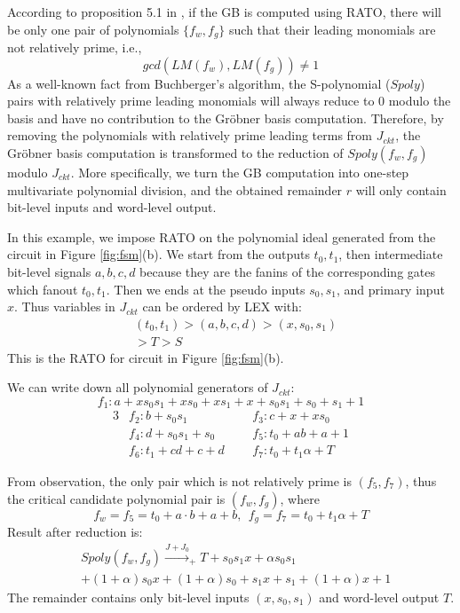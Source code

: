 According to proposition 5.1 in \cite{pruss:tcad15}, if the GB is computed using RATO, 
there will be only one pair of polynomials $\{f_w,f_g\}$ such that 
their leading monomials are not relatively prime, i.e., 
$$gcd(LM(f_w), LM(f_g)) \neq 1$$
As a well-known fact from Buchberger's algorithm, the S-polynomial 
($Spoly$) pairs with relatively prime 
leading monomials will always reduce to 0 modulo the basis and have no contribution to 
the Gr\"obner basis computation.
Therefore, by removing the polynomials with relatively prime leading terms from $J_{ckt}$, 
the Gr\"obner basis computation is transformed to the reduction of 
$Spoly(f_w,f_g)$ modulo $J_{ckt}$. More specifically, we turn the
GB computation into one-step multivariate polynomial division, and the obtained
remainder $r$ will only contain bit-level inputs and word-level output. 

\begin{Example}
In this example, we impose RATO on the polynomial ideal generated from the circuit in Figure \ref{fig:fsm}(b).
We start from the outputs $t_0,t_1$, then intermediate bit-level signals $a,b,c,d$ because they are 
the fanins of the corresponding gates which fanout $t_0,t_1$. Then we ends at the pseudo inputs $s_0,s_1$,
and primary input $x$.
Thus variables in $J_{ckt}$ can be ordered by LEX with:
\begin{align}
&(t_0,t_1)>(a,b,c,d)>(x,s_0,s_1)\nonumber\\&>T>S\nonumber
\end{align}
This is the RATO for circuit in Figure \ref{fig:fsm}(b).

We can write down all polynomial generators of $J_{ckt}$:
\begin{equation*}
f_1: a+xs_0s_1+xs_0+xs_1+x+s_0s_1+s_0+s_1+1
\end{equation*}
\vspace{-0.8cm}
\begin{alignat*}{3}
& f_2: b+s_0s_1 &&~~~ f_3: c+x+xs_0 \\
& f_4: d+s_0s_1+s_0 &&~~~ f_5: t_0+ab+a+1 \\
& f_6: t_1+cd+c+d &&~~~ f_7: t_0+t_1\alpha+T 
\end{alignat*}

From observation, the only pair which is not relatively prime is
$(f_5,f_7)$, thus the critical candidate polynomial pair is
$(f_w,f_g)$, where $$f_w =f_5= t_0+a\cdot b+a+b, ~~f_g =f_7=t_0+t_1\alpha + T$$
Result after reduction is:
\begin{align}
&Spoly(f_w,f_g) \xrightarrow{J+J_0}_{+}T + s_0 s_1 x+\alpha s_0 s_1 \nonumber\\
&+(1+\alpha)s_0 x+(1+\alpha) s_0+s_1 x+s_1+(1+\alpha) x+1\nonumber
\end{align}
The remainder contains only bit-level inputs $(x,s_0,s_1)$ and word-level output $T$.
\end{Example}


